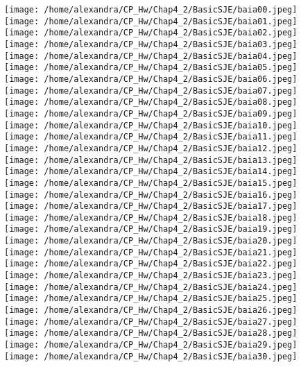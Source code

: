 \documentclass[11pt,twoside,a4paper]{article}
\begin{document}
\begin{figure}[htbp]
\centering
\texttt{[image: /home/alexandra/CP\_Hw/Chap4\_2/BasicSJE/baia00.jpeg]}
\texttt{[image: /home/alexandra/CP\_Hw/Chap4\_2/BasicSJE/baia01.jpeg]}
\texttt{[image: /home/alexandra/CP\_Hw/Chap4\_2/BasicSJE/baia02.jpeg]}
\texttt{[image: /home/alexandra/CP\_Hw/Chap4\_2/BasicSJE/baia03.jpeg]}
\texttt{[image: /home/alexandra/CP\_Hw/Chap4\_2/BasicSJE/baia04.jpeg]}
\texttt{[image: /home/alexandra/CP\_Hw/Chap4\_2/BasicSJE/baia05.jpeg]}
\texttt{[image: /home/alexandra/CP\_Hw/Chap4\_2/BasicSJE/baia06.jpeg]}
\texttt{[image: /home/alexandra/CP\_Hw/Chap4\_2/BasicSJE/baia07.jpeg]}
\texttt{[image: /home/alexandra/CP\_Hw/Chap4\_2/BasicSJE/baia08.jpeg]}
\texttt{[image: /home/alexandra/CP\_Hw/Chap4\_2/BasicSJE/baia09.jpeg]}
\texttt{[image: /home/alexandra/CP\_Hw/Chap4\_2/BasicSJE/baia10.jpeg]}
\texttt{[image: /home/alexandra/CP\_Hw/Chap4\_2/BasicSJE/baia11.jpeg]}
\texttt{[image: /home/alexandra/CP\_Hw/Chap4\_2/BasicSJE/baia12.jpeg]}
\texttt{[image: /home/alexandra/CP\_Hw/Chap4\_2/BasicSJE/baia13.jpeg]}
\texttt{[image: /home/alexandra/CP\_Hw/Chap4\_2/BasicSJE/baia14.jpeg]}
\texttt{[image: /home/alexandra/CP\_Hw/Chap4\_2/BasicSJE/baia15.jpeg]}
\texttt{[image: /home/alexandra/CP\_Hw/Chap4\_2/BasicSJE/baia16.jpeg]}
\texttt{[image: /home/alexandra/CP\_Hw/Chap4\_2/BasicSJE/baia17.jpeg]}
\texttt{[image: /home/alexandra/CP\_Hw/Chap4\_2/BasicSJE/baia18.jpeg]}
\texttt{[image: /home/alexandra/CP\_Hw/Chap4\_2/BasicSJE/baia19.jpeg]}
\texttt{[image: /home/alexandra/CP\_Hw/Chap4\_2/BasicSJE/baia20.jpeg]}
\texttt{[image: /home/alexandra/CP\_Hw/Chap4\_2/BasicSJE/baia21.jpeg]}
\texttt{[image: /home/alexandra/CP\_Hw/Chap4\_2/BasicSJE/baia22.jpeg]}
\texttt{[image: /home/alexandra/CP\_Hw/Chap4\_2/BasicSJE/baia23.jpeg]}
\texttt{[image: /home/alexandra/CP\_Hw/Chap4\_2/BasicSJE/baia24.jpeg]}
\texttt{[image: /home/alexandra/CP\_Hw/Chap4\_2/BasicSJE/baia25.jpeg]}
\texttt{[image: /home/alexandra/CP\_Hw/Chap4\_2/BasicSJE/baia26.jpeg]}
\texttt{[image: /home/alexandra/CP\_Hw/Chap4\_2/BasicSJE/baia27.jpeg]}
\texttt{[image: /home/alexandra/CP\_Hw/Chap4\_2/BasicSJE/baia28.jpeg]}
\texttt{[image: /home/alexandra/CP\_Hw/Chap4\_2/BasicSJE/baia29.jpeg]}
\texttt{[image: /home/alexandra/CP\_Hw/Chap4\_2/BasicSJE/baia30.jpeg]}

\end{figure}
\end{document}
